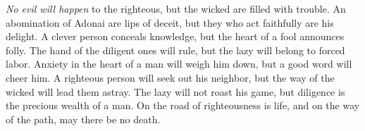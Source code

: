 \begin{biblechapter}
\verse \textit{No evil will happen} to the righteous, 
but the wicked are filled with trouble.
\verse An abomination of Adonai are lips of deceit, 
but they who act faithfully are his delight.
\verse A clever person conceals knowledge, 
but the heart of a fool announces folly.
\verse The hand of the diligent ones will rule, 
but the lazy will belong to forced labor.
\verse Anxiety in the heart of a man will weigh him down, 
but a good word will cheer him.
\verse A righteous person will seek out his neighbor, 
but the way of the wicked will lead them astray.
\verse The lazy will not roast his game, 
but diligence is the precious wealth of a man.
\verse On the road of righteousness is life, 
and on the way of the path, may there be no death.
\end{biblechapter}

